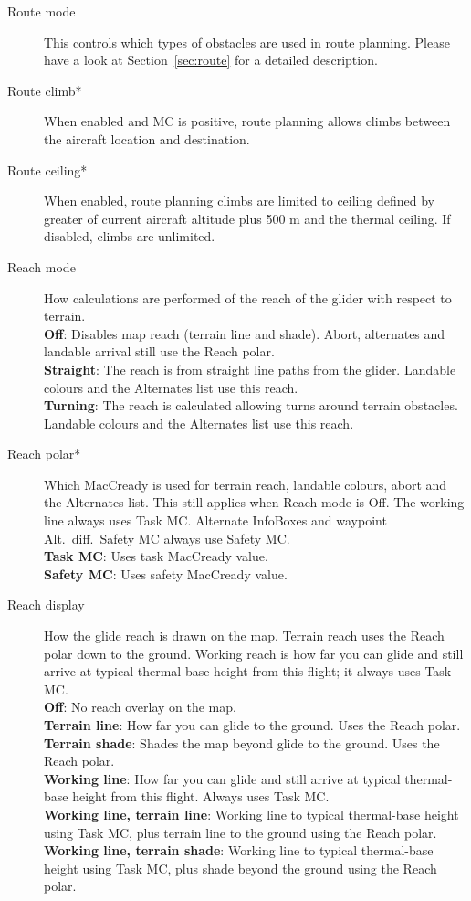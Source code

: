 \begin{description}
\item[Route mode]  \label{conf:routemode} This controls which types
  of obstacles are used in route planning. Please have a look at Section~\ref{sec:route} 
  for a detailed description.
\item[Route climb*]  \label{conf:routeclimb} When enabled and MC is positive, route 
  planning allows climbs between the aircraft location and destination.
\item[Route ceiling*]  \label{conf:routeceiling} When enabled, route planning climbs 
  are limited to ceiling defined by greater of current aircraft altitude plus 
  500 m and the thermal ceiling.  If disabled, climbs are unlimited.
\\
\item[Reach mode]  \label{conf:turningreach} How calculations are performed of 
  the reach of the glider with respect to terrain. \\
  {\bf Off}: Disables map reach (terrain line and shade). Abort, alternates
  and landable arrival still use the Reach polar. \\
  {\bf Straight}: The reach is from straight line paths from the glider.
    Landable colours and the Alternates list use this reach. \\
  {\bf Turning}: The reach is calculated allowing turns around terrain obstacles.
    Landable colours and the Alternates list use this reach.
\item[Reach polar*]  \label{conf:reachpolar} Which MacCready is used for
  terrain reach, landable colours, abort and the Alternates list.
  This still applies when Reach mode is Off.
  The working line always uses Task MC.  Alternate InfoBoxes and waypoint
  Alt.\ diff.\ Safety MC always use Safety MC. \\
  {\bf Task MC}: Uses task MacCready value. \\
  {\bf Safety MC}: Uses safety MacCready value.
\item[Reach display]  \label{conf:gliderange} How the glide reach is drawn
  on the map. Terrain reach uses the Reach polar down to the ground.
  Working reach is how far you can glide and still arrive at typical
  thermal-base height from this flight; it always uses Task MC. \\
  {\bf Off}: No reach overlay on the map. \\
  {\bf Terrain line}: How far you can glide to the ground. Uses the Reach polar. \\
  {\bf Terrain shade}: Shades the map beyond glide to the ground. Uses the Reach polar. \\
  {\bf Working line}: How far you can glide and still arrive at typical thermal-base height from this flight. Always uses Task MC. \\
  {\bf Working line, terrain line}: Working line to typical thermal-base height using Task MC, plus terrain line to the ground using the Reach polar. \\
  {\bf Working line, terrain shade}: Working line to typical thermal-base height using Task MC, plus shade beyond the ground using the Reach polar.
\end{description}


